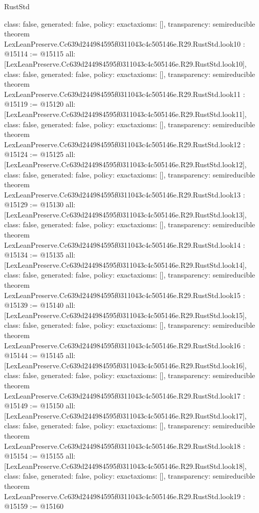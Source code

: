 \begin{lexlean}{RustStd}
\begin{coremodule}
{  class: false,
  generated: false,
  policy: exact{axioms: []},
  transparency: semireducible
}
theorem LexLeanPreserve.Cc639d244984595f0311043c4c505146e.R29.RustStd.look10 : @15114 := @15115 {
  all: [LexLeanPreserve.Cc639d244984595f0311043c4c505146e.R29.RustStd.look10],
  class: false,
  generated: false,
  policy: exact{axioms: []},
  transparency: semireducible
}
theorem LexLeanPreserve.Cc639d244984595f0311043c4c505146e.R29.RustStd.look11 : @15119 := @15120 {
  all: [LexLeanPreserve.Cc639d244984595f0311043c4c505146e.R29.RustStd.look11],
  class: false,
  generated: false,
  policy: exact{axioms: []},
  transparency: semireducible
}
theorem LexLeanPreserve.Cc639d244984595f0311043c4c505146e.R29.RustStd.look12 : @15124 := @15125 {
  all: [LexLeanPreserve.Cc639d244984595f0311043c4c505146e.R29.RustStd.look12],
  class: false,
  generated: false,
  policy: exact{axioms: []},
  transparency: semireducible
}
theorem LexLeanPreserve.Cc639d244984595f0311043c4c505146e.R29.RustStd.look13 : @15129 := @15130 {
  all: [LexLeanPreserve.Cc639d244984595f0311043c4c505146e.R29.RustStd.look13],
  class: false,
  generated: false,
  policy: exact{axioms: []},
  transparency: semireducible
}
theorem LexLeanPreserve.Cc639d244984595f0311043c4c505146e.R29.RustStd.look14 : @15134 := @15135 {
  all: [LexLeanPreserve.Cc639d244984595f0311043c4c505146e.R29.RustStd.look14],
  class: false,
  generated: false,
  policy: exact{axioms: []},
  transparency: semireducible
}
theorem LexLeanPreserve.Cc639d244984595f0311043c4c505146e.R29.RustStd.look15 : @15139 := @15140 {
  all: [LexLeanPreserve.Cc639d244984595f0311043c4c505146e.R29.RustStd.look15],
  class: false,
  generated: false,
  policy: exact{axioms: []},
  transparency: semireducible
}
theorem LexLeanPreserve.Cc639d244984595f0311043c4c505146e.R29.RustStd.look16 : @15144 := @15145 {
  all: [LexLeanPreserve.Cc639d244984595f0311043c4c505146e.R29.RustStd.look16],
  class: false,
  generated: false,
  policy: exact{axioms: []},
  transparency: semireducible
}
theorem LexLeanPreserve.Cc639d244984595f0311043c4c505146e.R29.RustStd.look17 : @15149 := @15150 {
  all: [LexLeanPreserve.Cc639d244984595f0311043c4c505146e.R29.RustStd.look17],
  class: false,
  generated: false,
  policy: exact{axioms: []},
  transparency: semireducible
}
theorem LexLeanPreserve.Cc639d244984595f0311043c4c505146e.R29.RustStd.look18 : @15154 := @15155 {
  all: [LexLeanPreserve.Cc639d244984595f0311043c4c505146e.R29.RustStd.look18],
  class: false,
  generated: false,
  policy: exact{axioms: []},
  transparency: semireducible
}
theorem LexLeanPreserve.Cc639d244984595f0311043c4c505146e.R29.RustStd.look19 : @15159 := @15160 {
}
\end{coremodule}
\end{lexlean}
